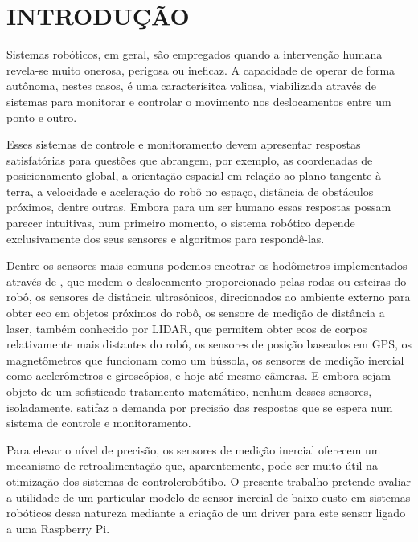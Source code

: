 \chapter{INTRODUÇÃO}
\label{chap:introducao}

Sistemas robóticos, em geral, são empregados quando a intervenção humana
revela-se muito onerosa, perigosa ou ineficaz. A capacidade de operar de forma
autônoma, nestes casos, é uma caracterísitca valiosa, viabilizada através de
sistemas para monitorar e controlar o movimento nos deslocamentos entre um
ponto e outro.

Esses sistemas de controle e monitoramento devem apresentar respostas
satisfatórias para questões que abrangem, por exemplo, as coordenadas de
posicionamento global, a orientação espacial em relação ao plano tangente à
terra, a velocidade e aceleração do robô no espaço, distância de obstáculos
próximos, dentre outras. Embora para um ser humano essas respostas possam
parecer intuitivas, num primeiro momento, o sistema robótico depende
exclusivamente dos seus sensores e algoritmos para respondê-las.

Dentre os sensores mais comuns podemos encotrar os hodômetros implementados
através de , que medem o deslocamento proporcionado pelas
rodas ou esteiras do robô, os sensores de distância ultrasônicos, direcionados
ao ambiente externo para obter eco em objetos próximos do robô, os sensore de
medição de distância a laser, também conhecido por LIDAR, que permitem obter
ecos de corpos relativamente mais distantes do robô, os sensores de posição
baseados em GPS, os magnetômetros que funcionam como um bússola, os sensores de
medição inercial como acelerômetros e giroscópios, e hoje até mesmo câmeras. E
embora sejam objeto de um sofisticado tratamento matemático, nenhum desses
sensores, isoladamente, satifaz a demanda por precisão das respostas que se
espera num sistema de controle e monitoramento.

Para elevar o nível de precisão, os sensores de medição inercial oferecem um
mecanismo de retroalimentação que, aparentemente, pode ser muito útil na
otimização dos sistemas de controlerobótibo. O presente trabalho pretende
avaliar a utilidade de um particular modelo de sensor inercial de baixo custo
em sistemas robóticos dessa natureza mediante a criação de um driver para este
sensor ligado a uma Raspberry Pi.

